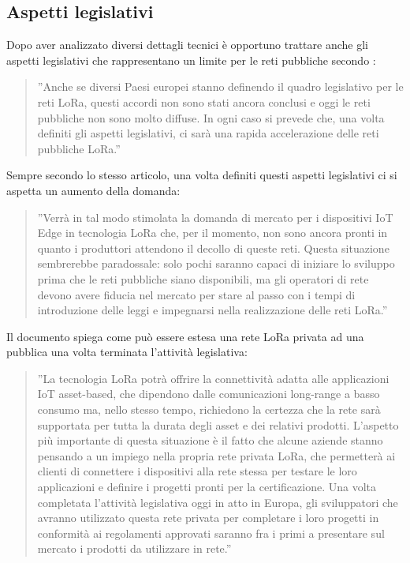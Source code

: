 \documentclass[a4paper]{report} %
\begin{document}
\subsection{Aspetti legislativi}
Dopo aver analizzato diversi dettagli tecnici è opportuno trattare anche gli aspetti legislativi che rappresentano un limite per le reti pubbliche secondo \cite{art:rif.20}:
\begin{quote}
	''Anche se diversi Paesi europei stanno definendo il quadro legislativo per le reti LoRa, questi accordi non sono stati ancora conclusi e oggi le reti pubbliche non sono molto diffuse. In ogni caso si prevede che, una volta definiti gli aspetti legislativi, ci sarà una rapida accelerazione delle reti pubbliche LoRa.''
\end{quote}
Sempre secondo lo stesso articolo, una volta definiti questi aspetti legislativi ci si aspetta un aumento della domanda:
\begin{quote}
	''Verrà in tal modo stimolata la domanda di mercato per i dispositivi IoT Edge in tecnologia LoRa che, per il momento, non sono ancora pronti in quanto i produttori attendono il decollo di queste reti. Questa situazione sembrerebbe paradossale: solo pochi saranno capaci di iniziare lo sviluppo prima che le reti pubbliche siano disponibili, ma gli operatori di rete devono avere fiducia nel mercato per stare al passo con i tempi di introduzione delle leggi e impegnarsi nella realizzazione delle reti LoRa.''
\end{quote}
Il documento \cite{art:rif.20} spiega come può essere estesa una rete LoRa privata ad una pubblica una volta terminata l'attività legislativa:
\begin{quote}
	''La tecnologia LoRa potrà offrire la connettività adatta alle applicazioni IoT asset-based, che dipendono dalle comunicazioni long-range a basso consumo ma, nello stesso tempo, richiedono la certezza che la rete sarà supportata per tutta la durata degli asset e dei relativi prodotti. L'aspetto più importante di questa situazione è il fatto che alcune aziende stanno pensando a un impiego nella propria rete privata LoRa, che permetterà ai clienti di connettere i dispositivi alla rete stessa per testare le loro applicazioni e definire i progetti pronti per la certificazione. Una volta completata l'attività legislativa oggi in atto in Europa, gli sviluppatori che avranno utilizzato questa rete privata per completare i loro progetti in conformità ai regolamenti approvati saranno fra i primi a presentare sul mercato i prodotti da utilizzare in rete.''
\end{quote}
\end{document}
